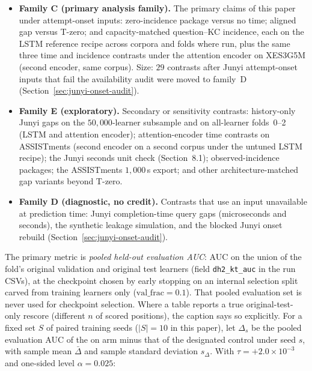 \begin{itemize}
  \item \textbf{Family C (primary analysis family).} The primary claims
  of this paper under attempt-onset inputs: zero-incidence package
  versus no time; aligned gap versus T-zero; and capacity-matched
  question--KC incidence, each on the LSTM reference recipe across
  corpora and folds where run, plus the same three time and incidence
  contrasts under the attention encoder on XES3G5M (second encoder, same
  corpus). Size: $29$ contrasts after Junyi attempt-onset inputs that
  fail the availability audit were moved to family~D
  (Section~\ref{sec:junyi-onset-audit}).
  \item \textbf{Family E (exploratory).} Secondary or sensitivity
  contrasts: history-only Junyi gaps on the $50{,}000$-learner subsample
  and on all-learner folds~0--2 (LSTM and attention encoder);
  attention-encoder time contrasts on ASSISTments (second encoder on a
  second corpus under the untuned LSTM recipe); the Junyi seconds
  unit check (Section~8.1); observed-incidence
  packages; the ASSISTments $1{,}000$\,s export; and other
  architecture-matched gap variants beyond T-zero.
  \item \textbf{Family D (diagnostic, no credit).} Contrasts that use an
  input unavailable at prediction time: Junyi completion-time query
  gaps (microseconds and seconds), the synthetic leakage simulation, and the blocked Junyi onset
  rebuild (Section~\ref{sec:junyi-onset-audit}).
\end{itemize}

The primary metric is \emph{pooled held-out evaluation AUC}: AUC on the
union of the fold's original validation and original test learners
(field \texttt{dh2\_kt\_auc} in the run CSVs), at the checkpoint chosen
by early stopping on an internal selection split carved from training
learners only ($\mathrm{val\_frac}{=}0.1$). That pooled evaluation set
is never used for checkpoint selection. Where a table reports a true
original-test-only rescore (different $n$ of scored positions), the
caption says so explicitly. For a fixed set $S$ of paired training seeds
($|S|{=}10$ in this paper), let $\Delta_s$ be the pooled evaluation AUC
of the on arm minus that of the designated control under seed $s$, with
sample mean $\bar\Delta$ and sample standard deviation $s_\Delta$. With
$\tau{=}{+}2.0\times 10^{-3}$ and one-sided level $\alpha{=}0.025$:

